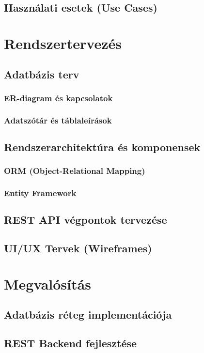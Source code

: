\documentclass[colorlinks]{thesis-kando}
\theoremstyle{definition}
\theoremstyle{remark}
\begin{document}
\section{Használati esetek (Use Cases)}

\chapter{Rendszertervezés}
\section{Adatbázis terv}
\subsection{ER-diagram és kapcsolatok}
\subsection{Adatszótár és táblaleírások}
\section{Rendszerarchitektúra és komponensek}
\subsection{ORM (Object-Relational Mapping)}
\subsection{Entity Framework}
\section{REST API végpontok tervezése}
\section{UI/UX Tervek (Wireframes)}

\chapter{Megvalósítás}
\section{Adatbázis réteg implementációja}
\section{REST Backend fejlesztése}
\end{document}

